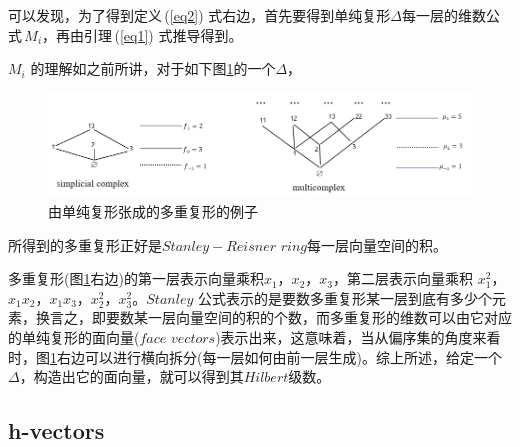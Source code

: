 可以发现，为了得到定义\,(\ref{eq2}) 式右边，首先要得到单纯复形$\Delta$每一层的维数公式\,$M_{i}$，再由引理\,(\ref{eq1}) 式推导得到。\par
$M_{i}$ 的理解如之前所讲，对于如下图\ref{fig1}的一个$\Delta$，
\begin{figure}[H] %
\centering %
    \includegraphics[width=1.2\textwidth]{tupianyi.png}
    \caption{由单纯复形张成的多重复形的例子}%
    \label{fig1} %
\end{figure}
\noindent 所得到的多重复形正好是$Stanley-Reisner$ $ring$每一层向量空间的积。\par
多重复形(图\ref{fig1}右边)的第一层表示向量乘积$x_{1}$，$x_{2}$，$x_{3}$，第二层表示向量乘积 $x^{2}_{1}$，$x_{1}x_{2}$，$x_{1}x_{3}$，$x^{2}_{2}$，$x^{2}_{3}$。$Stanley$ 公式表示的是要数多重复形某一层到底有多少个元素，换言之，即要数某一层向量空间的积的个数，而多重复形的维数可以由它对应的单纯复形的面向量($face$ $vectors$)表示出来，这意味着，当从偏序集的角度来看时，图\ref{fig1}右边可以进行横向拆分(每一层如何由前一层生成)。综上所述，给定一个$\Delta$，构造出它的面向量，就可以得到其$Hilbert$级数。

\subsection{h-vectors }

